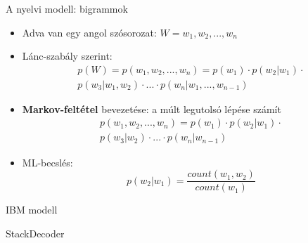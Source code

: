 \begin{frame}{A nyelvi modell: bigrammok}
	\begin{itemize}
		\item Adva van egy angol szósorozat: $W = w_1,w_2,...,w_n$
		\item Lánc-szabály szerint: \begin{equation*}
		\begin{split}
		p(W) = p(w_1,w_2,...,w_n) = p(w_1) \cdot p(w_2|w_1) \cdot \\p(w_3|w_1, w_2) \cdot ... \cdot p(w_n|w_1,...,w_{n-1})
		\end{split}
		\end{equation*}
		\item \textbf{Markov-feltétel} bevezetése: a múlt legutolsó lépése számít
		\begin{equation*}
		\begin{split}
		p(w_1,w_2,...,w_n) = p(w_1) \cdot p(w_2|w_1) \cdot \\p(w_3|w_2) \cdot ... \cdot p(w_n|w_{n-1})
		\end{split}
		\end{equation*}
		\item ML-becslés: 
		\begin{equation*}
		p(w_2|w_1) = \frac{count(w_1,w_2)}{count(w_1)}
		\end{equation*}
	\end{itemize}
\end{frame}

\begin{frame}{IBM modell}

\end{frame}

\begin{frame}{StackDecoder}

\end{frame}